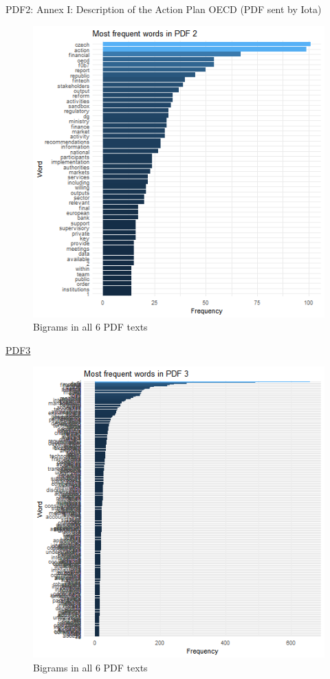 \documentclass[
]{book}
\begin{document}
PDF2: Annex I: Description of the Action Plan OECD (PDF sent by Iota)

\begin{figure}

{\centering \includegraphics[width=0.8\linewidth]{img/freqP2} 

}

\caption{Bigrams in all 6 PDF texts}\label{fig:nice-figF2}
\end{figure}

\href{https://www.esma.europa.eu/sites/default/files/library/esma50-164-2430_licensing_of_fintech.pdf}{PDF3}

\begin{figure}

{\centering \includegraphics[width=0.8\linewidth]{img/freqP3} 

}

\caption{Bigrams in all 6 PDF texts}\label{fig:nice-figF3}
\end{figure}
\end{document}
